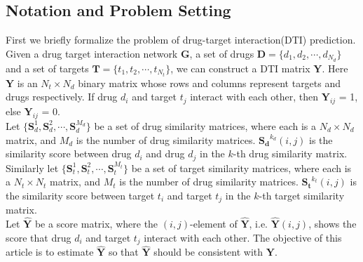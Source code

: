 \documentclass{article}
\begin{document}
\subsection{Notation and Problem Setting}
First we briefly formalize the problem of drug-target interaction(DTI) prediction. Given a drug target interaction network $\bm{G}$, a set of drugs $\bm{D}=\{d_1,d_2,\cdots,d_{N_d}\}$ and a set of targets $\bm{T}=\{t_1,t_2,\cdots,t_{N_t}\}$, we can construct a DTI matrix $\bm{Y}$. Here $\bm{Y}$ is an $N_t\times N_d$ binary matrix whose rows and columns represent targets and drugs respectively. If drug $d_i$ and target $t_j$ interact with each other, then $\bm{Y}_{ij}$ = 1, else $\bm{Y}_{ij}$ = 0. \\
\indent Let $\{\bm{S}_d^1,\bm{S}_d^2,\cdots,\bm{S}_d^{M_d}\}$ be a set of drug similarity matrices, where each is a $N_d\times N_d$ matrix, and ${M_d}$ is the number of drug similarity matrices. $\bm{S_d}^{k_d}(i,j)$ is the similarity score between drug $d_i$ and drug $d_j$ in the $k$-th drug similarity matrix. Similarly let $\{\bm{S}_t^1,\bm{S}_t^2,\cdots,\bm{S}_t^{M_t}\}$ be a set of target similarity matrices, where each is a $N_t\times N_t$ matrix, and ${M_t}$ is the number of drug similarity matrices. $\bm{S_t}^{k_t}(i,j)$ is the similarity score between target $t_i$ and target $t_j$ in the $k$-th target similarity matrix. \\
\indent Let $\bm{\hat{Y}}$ be a score matrix, where the $(i,j)$-element of $\bm{\hat{Y}}$, i.e. $\bm{\hat{Y}}(i,j)$, shows the score that drug $d_i$ and target $t_j$ interact with each other. The objective of this article is to estimate $\bm{\hat{Y}}$ so that $\bm{\hat{Y}}$ should be consistent with $\bm{Y}$.
\end{document}
